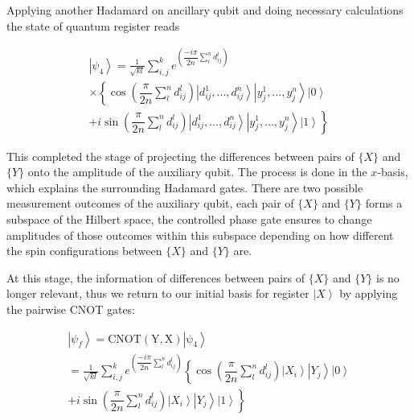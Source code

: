\documentclass[pra,showkeys,twocolumn,showpacs]{revtex4-1}
\begin{document}


Applying another Hadamard on ancillary qubit and doing necessary calculations the state of quantum register reads

\begin{multline}
    \left| \psi_4 \right\rangle = 
    \frac{1}{\sqrt{kl}} \sum\limits_{i, j}^{k} 
    e^{\left(\dfrac{-i \pi}{2n}\sum\limits_l^n d^l_{ij} \right)}
		\\ \times
        \left\{\cos\left(\dfrac{\pi}{2n}\sum\limits_l^n d^l_{ij} \right)
        \left| d^1_{ij}, \dots, d^n_{ij} \right\rangle 
        \left| y^1_j, \dots, y^n_j \right\rangle 
        \left| 0 \right\rangle\right.
        \\+ 
        \left. i \sin\left(\dfrac{\pi}{2n}\sum\limits_l^n d^l_{ij} \right)
        \left| d^1_{ij}, \dots, d^n_{ij} \right\rangle 
        \left| y^1_j, \dots, y^n_j \right\rangle 
        \left| 1 \right\rangle\right\}
\end{multline}


This completed the stage of projecting the differences between pairs of $\{X\}$ and $\{Y\}$ onto the amplitude of the auxiliary qubit. The process is done in the $x$-basis, which explains the surrounding Hadamard gates. There are two possible measurement outcomes of the auxiliary qubit, each pair of $\{X\}$ and $\{Y\}$ forms a subspace of the Hilbert space, the controlled phase gate ensures to change amplitudes of those outcomes within this subspace depending on how different the spin configurations between $\{X\}$ and $\{Y\}$ are.

At this stage, the information of differences between pairs of $\{X\}$ and $\{Y\}$ is no longer relevant, thus we return to our initial basis for register $\left| X \right\rangle$ by applying the pairwise CNOT gates:

\begin{multline}
    \left| \psi_f \right\rangle = 
    \mathrm{CNOT(Y,X)\left| \psi_4 \right\rangle} \\=  
    \frac{1}{\sqrt{kl}}\sum\limits_{i, j}^{k} 
    e^{\left(\dfrac{-i \pi}{2n}\sum\limits_l^n d^l_{ij} \right)}
				\left\{\cos\left(\dfrac{\pi}{2n}\sum\limits_l^n d^l_{ij} \right)
        \left| X_i \right\rangle 
        \left| Y_j \right\rangle 
        \left| 0 \right\rangle\right.
        \\+
        \left. i \sin\left(\dfrac{\pi}{2n}\sum\limits_l^n d^l_{ij} \right)
        \left| X_i \right\rangle 
        \left| Y_j \right\rangle 
        \left| 1 \right\rangle\right\}
\end{multline}
\end{document}
